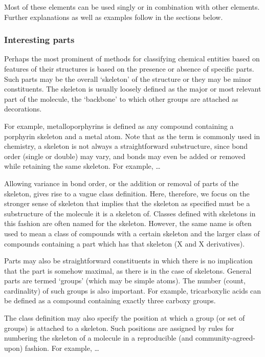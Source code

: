 \documentclass[10pt]{bmc_article}
\newenvironment{bmcformat}{\baselineskip20pt\sloppy\setboolean{publ}{false}}{\baselineskip20pt\sloppy}
\begin{document}
\begin{bmcformat}
Most of these elements can be used singly or in combination with other elements.  Further explanations as well as examples follow in the sections below. 


\subsubsection*{Interesting parts}

Perhaps the most prominent of methods for classifying chemical entities based on features of their structures is based on the presence or absence of specific parts.  Such parts may be the overall `skeleton' of the structure or they may be minor constituents. The skeleton is usually loosely defined as the major or most relevant part of the molecule, the `backbone' to which other groups are attached as decorations. 

For example, metalloporphyrins is defined as any compound containing a porphyrin skeleton and a metal atom.  Note that as the term is commonly used in chemistry, a skeleton is not always a straightforward substructure, since bond order (single or double) may vary, and bonds may even be added or removed while retaining the same skeleton. For example, \ldots
 
Allowing variance in bond order, or the addition or removal of parts of the skeleton, gives rise to a vague class definition. Here, therefore, we focus on the stronger sense of skeleton that implies that the skeleton as specified must be a substructure of the molecule it is a skeleton of. Classes defined with skeletons in this fashion are often named for the skeleton.  However, the same name is often used to mean a class of compounds with a certain skeleton and the larger class of compounds containing a part which has that skeleton (X and X derivatives). 

Parts may also be straightforward constituents in which there is no implication that the part is somehow maximal, as there is in the case of skeletons.  General parts are termed `groups' (which may be simple atoms). The number (count, cardinality) of such groups is also important.  For example, tricarboxylic acids can be defined as a compound containing exactly three carboxy groups. 

The class definition may also specify the position at which a group (or set of groups) is attached to a skeleton. Such positions are assigned by rules for numbering the skeleton of a molecule in a reproducible (and community-agreed-upon) fashion.  For example, \ldots


\end{bmcformat}
\end{document}
